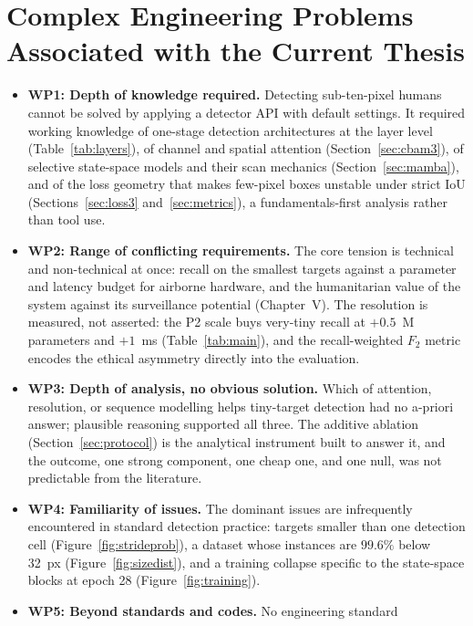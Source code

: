 \section{Complex Engineering Problems Associated with the Current Thesis}
\begin{itemize}
  \item \textbf{WP1: Depth of knowledge required.} Detecting sub-ten-pixel
        humans cannot be solved by applying a detector API with default
        settings. It required working knowledge of one-stage detection
        architectures at the layer level (Table~\ref{tab:layers}), of
        channel and spatial attention (Section~\ref{sec:cbam3}), of selective
        state-space models and their scan mechanics (Section~\ref{sec:mamba}), and of
        the loss geometry that makes few-pixel boxes unstable under strict
        IoU (Sections~\ref{sec:loss3} and~\ref{sec:metrics}), a fundamentals-first analysis rather
        than tool use.
  \item \textbf{WP2: Range of conflicting requirements.} The core tension is
        technical and non-technical at once: recall on the smallest targets
        against a parameter and latency budget for airborne hardware, and
        the humanitarian value of the system against its surveillance
        potential (Chapter~V). The resolution is measured, not asserted: the
        P2 scale buys very-tiny recall at $+0.5$~M parameters and $+1$~ms
        (Table~\ref{tab:main}), and the recall-weighted $F_2$ metric encodes
        the ethical asymmetry directly into the evaluation.
  \item \textbf{WP3: Depth of analysis, no obvious solution.} Which of
        attention, resolution, or sequence modelling helps tiny-target
        detection had no a-priori answer; plausible reasoning supported all
        three. The additive ablation (Section~\ref{sec:protocol}) is the analytical
        instrument built to answer it, and the outcome, one strong
        component, one cheap one, and one null, was not predictable from
        the literature.
  \item \textbf{WP4: Familiarity of issues.} The dominant issues are
        infrequently encountered in standard detection practice: targets
        smaller than one detection cell (Figure~\ref{fig:strideprob}), a
        dataset whose instances are $99.6\%$ below 32~px
        (Figure~\ref{fig:sizedist}), and a training collapse specific to
        the state-space blocks at epoch 28 (Figure~\ref{fig:training}).
  \item \textbf{WP5: Beyond standards and codes.} No engineering standard

\end{itemize}
